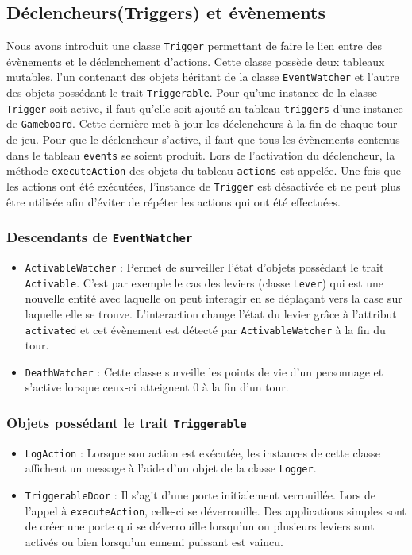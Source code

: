 \documentclass[10pt,a4paper]{article}
\begin{document}
\subsection{Déclencheurs(Triggers) et évènements}
Nous avons introduit une classe \texttt{Trigger} permettant de faire le lien entre des évènements et le déclenchement d'actions. Cette classe possède deux tableaux mutables, l'un contenant des objets héritant de la classe \texttt{EventWatcher} et l'autre des objets possédant le trait \texttt{Triggerable}. Pour qu'une instance de la classe \texttt{Trigger} soit active, il faut qu'elle soit ajouté au tableau \texttt{triggers} d'une instance de \texttt{Gameboard}. Cette dernière met à jour les déclencheurs à la fin de chaque tour de jeu. Pour que le déclencheur s'active, il faut que tous les évènements contenus dans le tableau \texttt{events} se soient produit. Lors de l'activation du déclencheur, la méthode \texttt{executeAction} des objets du tableau \texttt{actions} est appelée. Une fois que les actions ont été exécutées, l'instance de \texttt{Trigger} est désactivée et ne peut plus être utilisée afin d'éviter de répéter les actions qui ont été effectuées.

\subsubsection{Descendants de \texttt{EventWatcher}}
\begin{itemize}
	\item \texttt{ActivableWatcher} : Permet de surveiller l'état d'objets possédant le trait \texttt{Activable}. C'est par exemple le cas des leviers (classe \texttt{Lever}) qui est une nouvelle entité avec laquelle on peut interagir en se déplaçant vers la case sur laquelle elle se trouve. L'interaction change l'état du levier grâce à l'attribut \texttt{activated} et cet évènement est détecté par \texttt{ActivableWatcher} à la fin du tour.
	\item \texttt{DeathWatcher} : Cette classe surveille les points de vie d'un personnage et s'active lorsque ceux-ci atteignent 0 à la fin d'un tour.
\end{itemize}

\subsubsection{Objets possédant le trait \texttt{Triggerable}}
\begin{itemize}
	\item \texttt{LogAction} : Lorsque son action est exécutée, les instances de cette classe affichent un message à l'aide d'un objet de la classe \texttt{Logger}.
	\item \texttt{TriggerableDoor} : Il s'agit d'une porte initialement verrouillée. Lors de l'appel à \texttt{executeAction}, celle-ci se déverrouille. Des applications simples sont de créer une porte qui se déverrouille lorsqu'un ou plusieurs leviers sont activés ou bien lorsqu'un ennemi puissant est vaincu.
\end{itemize}
\end{document}
